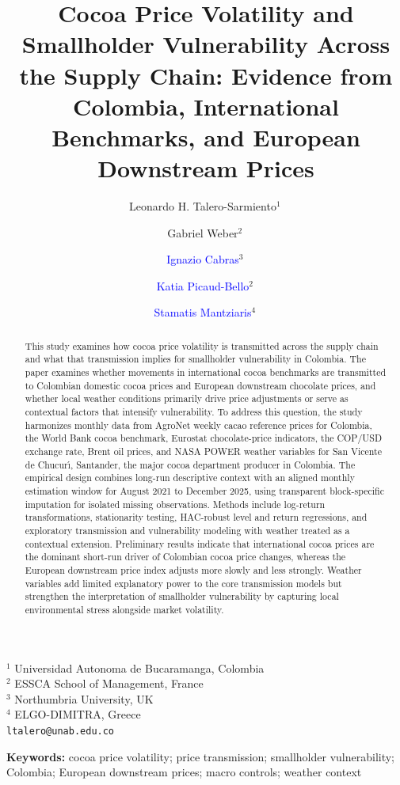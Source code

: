 \documentclass[11pt]{article}
\title{Cocoa Price Volatility and Smallholder Vulnerability Across the Supply Chain: Evidence from Colombia, International Benchmarks, and European Downstream Prices}
\author{
Leonardo H. Talero-Sarmiento$^{1}$\,\orcidlink{0000-0002-4129-9163} \and
Gabriel Weber$^{2}$\,\orcidlink{0000-0003-2120-1648} \and
\textcolor{blue}{Ignazio Cabras}$^{3}$\,\orcidlink{0000-0002-3418-8553} \and
\textcolor{blue}{Katia Picaud-Bello}$^{2}$\,\orcidlink{0000-0001-7538-0210} \and
\textcolor{blue}{Stamatis Mantziaris}$^{4}$\,\orcidlink{0000-0001-7047-1447}
}
\date{}
\begin{document}
\maketitle
\begin{center}
\small
$^{1}$ Universidad Autonoma de Bucaramanga, Colombia \\ 
$^{2}$ ESSCA School of Management, France \\
$^{3}$ Northumbria University, UK \\
$^{4}$ ELGO-DIMITRA, Greece \\
\texttt{ltalero@unab.edu.co}
\end{center}

\begin{abstract}
This study examines how cocoa price volatility is transmitted across the supply chain and what that transmission implies for smallholder vulnerability in Colombia. The paper examines whether movements in international cocoa benchmarks are transmitted to Colombian domestic cocoa prices and European downstream chocolate prices, and whether local weather conditions primarily drive price adjustments or serve as contextual factors that intensify vulnerability. To address this question, the study harmonizes monthly data from AgroNet weekly cacao reference prices for Colombia, the World Bank cocoa benchmark, Eurostat chocolate-price indicators, the COP/USD exchange rate, Brent oil prices, and NASA POWER weather variables for San Vicente de Chucur\'{\i}, Santander, the major cocoa department producer in Colombia. The empirical design combines long-run descriptive context with an aligned monthly estimation window for August 2021 to December 2025, using transparent block-specific imputation for isolated missing observations. Methods include log-return transformations, stationarity testing, HAC-robust level and return regressions, and exploratory transmission and vulnerability modeling with weather treated as a contextual extension. Preliminary results indicate that international cocoa prices are the dominant short-run driver of Colombian cocoa price changes, whereas the European downstream price index adjusts more slowly and less strongly. Weather variables add limited explanatory power to the core transmission models but strengthen the interpretation of smallholder vulnerability by capturing local environmental stress alongside market volatility. 
\end{abstract}
\textbf{Keywords:} cocoa price volatility; price transmission; smallholder vulnerability; Colombia; European downstream prices; macro controls; weather context
\end{document}
